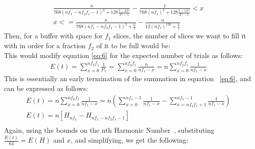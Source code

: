 \documentclass[runningheads]{llncs}
\begin{document}
    \begin{gather}
   \frac{n}{768({nf_1 - nf_2f_1 - 1})^2+128\frac{7-12\gamma}{2\gamma - 1}} - \frac{1}{768({nf_1})^2+128\frac{7-12\gamma}{2\gamma - 1}} < x \\
   x <= \frac{n}{768({nf_1-nf_2f_1-1})^2+\frac{6}{5}} - \frac{n}{12({nf_1})^128+\frac{6}{5}} 
	\end{gather}
Then, for a buffer with space for $f_1$ slices, the number of slices we want to fill it with in order for a fraction $f_2$ of it to be full would be: \\
This would modify equation \ref{eq:6} for the expected number of trials as follows:
\begin{gather}
    E(t) = \sum_{x=0}^{nf_2f_1}\frac{1}{P_x} = \sum_{x=0}^{nf_2f_1}\frac{n}{nf_1-x} = n\sum_{x=0}^{nf_2f_1}\frac{1}{nf_1-x}
\end{gather}
This is essentially an early termination of the summation in equation ~\ref{eq:6}, and can be expressed as follows:
\begin{gather}
    E(t) = n\sum_{x=0}^{nf_2f_1}\frac{1}{nf_1-x} = n(\sum_{x=0}^{nf_1-1}\frac{1}{nf_1-x} - \sum_{x=nf_2f_1+1}^{nf_1-1}\frac{1}{nf_1-x}) \\
    E(t) = n[H_{nf_1} - H_{nf_1 - nf_2f_1 - 1}]\\
\end{gather}
Again, using the bounds on the nth Harmonic Number~\cite{harmonicNumber}, substituting $\frac{E(t)}{64} = E(H)$ and $x$, and simplifying, we get the following: \\
\end{document}
